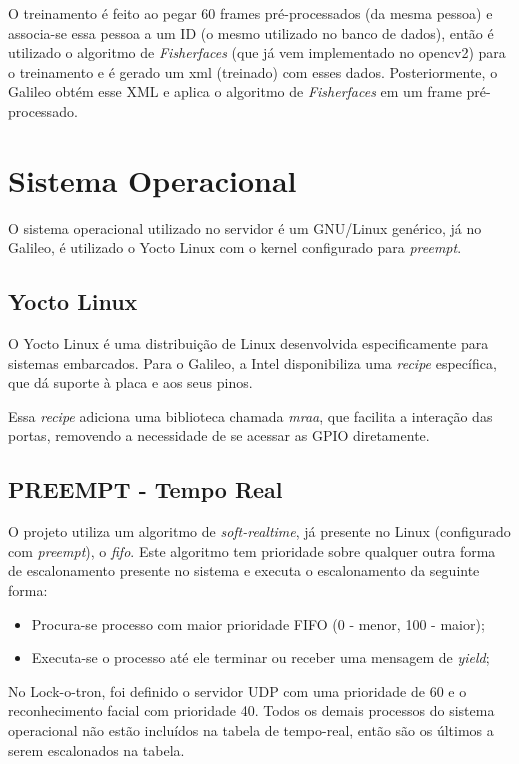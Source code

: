 \documentclass[12pt]{article}
\begin{document}
     O treinamento é feito ao pegar 60 frames pré-processados (da mesma pessoa)
     e associa-se essa pessoa a um ID (o mesmo utilizado no banco de dados),
     então é utilizado o algoritmo de \textit{Fisherfaces} (que já vem
     implementado no opencv2) para o treinamento e é gerado um xml (treinado)
     com esses dados. Posteriormente, o Galileo obtém esse XML e aplica o
     algoritmo de \textit{Fisherfaces} em um frame pré-processado.

\section{Sistema Operacional}
    O sistema operacional utilizado no servidor é um GNU/Linux genérico, já no
    Galileo, é utilizado o Yocto Linux com o kernel configurado para
    \textit{preempt}.

\subsection{Yocto Linux}
    O Yocto Linux é uma distribuição de Linux desenvolvida especificamente para
    sistemas embarcados. Para o Galileo, a Intel disponibiliza uma
     \textit{recipe} específica, que dá suporte à placa e aos seus pinos.

    Essa \textit{recipe} adiciona uma biblioteca chamada \textit{mraa},
    que facilita a interação das portas, removendo a necessidade de se acessar
    as GPIO diretamente.

\subsection{PREEMPT - Tempo Real}
    O projeto utiliza um algoritmo de \textit{soft-realtime}, já presente no
    Linux (configurado com \textit{preempt}), o \textit{fifo}. Este algoritmo tem
    prioridade sobre qualquer outra forma de escalonamento presente no sistema
    e executa o escalonamento da seguinte forma:
    \begin{itemize}
        \item Procura-se processo com maior prioridade FIFO (0 - menor, 100 -
        maior);
        \item Executa-se o processo até ele terminar ou receber uma mensagem de
        \textit{yield};
    \end{itemize}

    No Lock-o-tron, foi definido o servidor UDP com uma prioridade de 60 e o
    reconhecimento facial com prioridade 40. Todos os demais processos do
    sistema operacional não estão incluídos na tabela de tempo-real, então são
    os últimos a serem escalonados na tabela.
\end{document}
